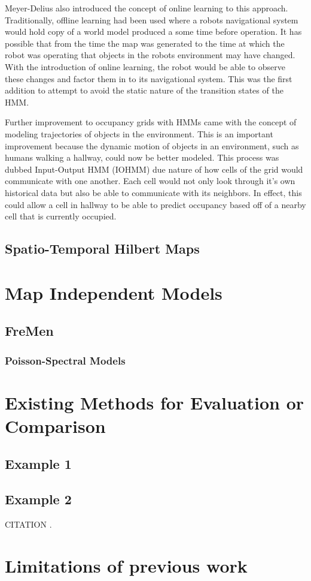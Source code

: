 Meyer-Delius \cite{Meyer-Delius2012} also introduced the concept of online
learning to this approach. Traditionally, offline learning had been used where
a robots navigational system would hold copy of a world model produced a some
time before operation. It has possible that from the time the map was generated
to the time at which the robot was operating that objects in the robots
environment may have changed. With the introduction of online learning, the
robot would be able to observe these changes and factor them in to its
navigational system. This was the first addition to attempt to avoid the static
nature of the transition states of the HMM.

Further improvement to occupancy grids with HMMs came with the concept of
modeling trajectories of objects in the environment\cite{Wang2015}. This is an
important improvement because the dynamic motion of objects in an environment,
such as humans walking a hallway, could now be better modeled. This process
was dubbed Input-Output HMM (IOHMM) due nature of how cells of the grid would
communicate with one another. Each cell would not only look through it's own
historical data but also be able to communicate with its neighbors. In effect,
this could allow a cell in hallway to be able to predict occupancy based off of
a nearby cell that is currently occupied.

\subsection{ Spatio-Temporal Hilbert Maps }


\section{ Map Independent Models }
\subsection{ FreMen }
\subsubsection{ Poisson-Spectral Models }


\section{ Existing Methods for Evaluation or Comparison }

\subsection { Example 1 }
\subsection { Example 2 }


CITATION \cite{art1}.
\section{Limitations of previous work}
